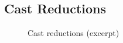\documentclass[runningheads]{llncs}
\begin{document}
\subsection{Cast Reductions}
\label{sec:special-reductions}

\begin{figure}[tp]
\begin{mathpar}

\end{mathpar}
  \caption{Cast reductions (excerpt)}
  \label{fig:cast-reductions}
\end{figure}
\end{document}
